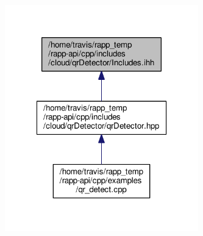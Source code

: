 \nopagebreak
\begin{figure}[H]
\begin{center}
\leavevmode
\includegraphics[width=238pt]{cloud_2qrDetector_2Includes_8ihh__dep__incl}
\end{center}
\end{figure}
